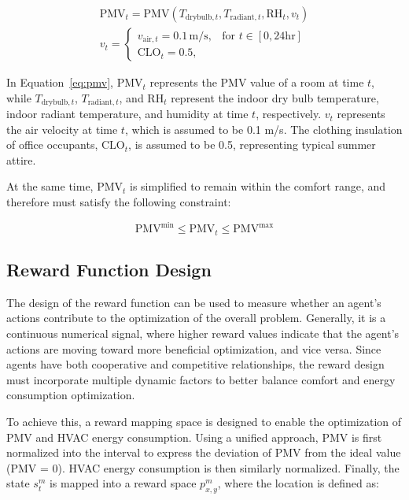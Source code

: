 \documentclass[preprint,12pt]{elsarticle}
\begin{document}
\begin{equation} \label{eq:pmv}
    \begin{gathered}
        \text{PMV}_t = \text{PMV}(T_{\text{drybulb},t}, T_{\text{radiant},t}, \text{RH}_t, v_t) \\
        v_t = 
        \begin{cases} 
            v_{\text{air},t} = 0.1 \, \text{m/s}, & \text{for } t \in [0, 24\text{hr}] \\
            \text{CLO}_t = 0.5, & 
        \end{cases}
    \end{gathered}
\end{equation}

In Equation~\ref{eq:pmv}, $\text{PMV}_t$ represents the PMV value of a room at time $t$, 
while $T_{\text{drybulb},t}$, $T_{\text{radiant},t}$, and $\text{RH}_t$ represent the 
indoor dry bulb temperature, indoor radiant temperature, and humidity at time $t$, respectively.
 $v_t$ represents the air velocity at time $t$, which is assumed to be 0.1 m/s. The clothing 
 insulation of office occupants, $\text{CLO}_t$, is assumed to be 0.5, representing typical summer attire.

At the same time, $\text{PMV}_t$ is simplified to remain within the comfort range, 
and therefore must satisfy the following constraint:

\begin{equation}
    \text{PMV}^{\min} \leq \text{PMV}_t \leq \text{PMV}^{\max}
\end{equation}

\subsection{Reward Function Design}

The design of the reward function can be used to measure whether an agent's actions contribute 
to the optimization of the overall problem. Generally, it is a continuous numerical signal, 
where higher reward values indicate that the agent's actions are moving toward more beneficial optimization, 
and vice versa. Since agents have both cooperative and competitive relationships, the reward design must 
incorporate multiple dynamic factors to better balance comfort and energy consumption optimization.

To achieve this, a reward mapping space is designed to enable the optimization of PMV and HVAC energy consumption. 
Using a unified approach, PMV is first normalized into the interval to express the deviation of PMV 
from the ideal value (PMV = 0). HVAC energy consumption is then similarly normalized. Finally, the state $s_t^m$ 
is mapped into a reward space $p_{x,y}^m$, where the location is defined as:
\end{document}
